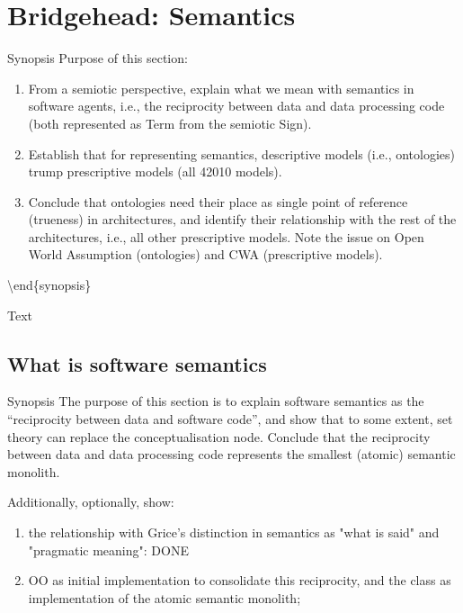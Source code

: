 \documentclass[a4paper,11pt,oneside,oldfontcommands]{memoir}
\theoremstyle{definition}
\theoremstyle{break}		%
\numberwithin{equation}{chapter}
\numberwithin{figure}{chapter}
\begin{document}
\hypertarget{bridgehead-semantics}{%
\chapter{Bridgehead: Semantics}\label{bridgehead-semantics}}

Synopsis Purpose of this section:

\begin{enumerate}
\item From a semiotic perspective, explain what we mean with semantics in software agents, i.e., the reciprocity between data and data processing code (both represented as Term from the semiotic Sign).
\item Establish that for representing semantics, descriptive models (i.e., ontologies) trump prescriptive models (all 42010 models).
\item Conclude that ontologies need their place as single point of reference (trueness) in architectures, and identify their relationship with the rest of the architectures, i.e., all other prescriptive models. Note the issue on Open World Assumption (ontologies) and CWA (prescriptive models).
\end{enumerate}

\textbackslash{}end\{synopsis\}

Text

\hypertarget{what-is-software-semantics}{%
\section{What is software semantics}\label{what-is-software-semantics}}

Synopsis The purpose of this section is to explain software semantics as
the ``reciprocity between data and software code'', and show that to
some extent, set theory can replace the conceptualisation node. Conclude
that the reciprocity between data and data processing code represents
the smallest (atomic) semantic monolith.

Additionally, optionally, show:

\begin{enumerate}
\item the relationship with Grice's distinction in semantics as "what is said" and "pragmatic meaning": DONE
\item OO as initial implementation to consolidate this reciprocity, and the class as implementation of the atomic semantic monolith; 
\end{enumerate}
\end{document}
